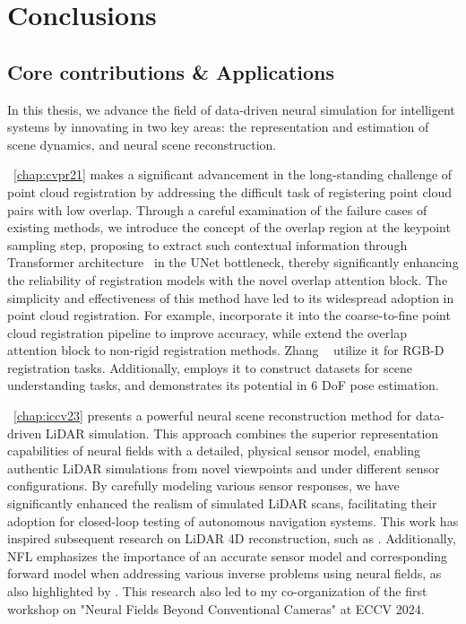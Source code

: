 \chapter{Conclusions}
\label{chap:conclusion}

\section{Core contributions \& Applications}
In this thesis, we advance the field of data-driven neural simulation for intelligent systems by innovating in two key areas: the representation and estimation of scene dynamics, and neural scene reconstruction.

~\cref{chap:cvpr21} makes a significant advancement in the long-standing challenge of point cloud registration by addressing the difficult task of registering point cloud pairs with low overlap. Through a careful examination of the failure cases of existing methods, we introduce the concept of the overlap region at the keypoint sampling step, proposing to extract such contextual information through Transformer architecture~\cite{vaswani2017attention} in the UNet bottleneck, thereby significantly enhancing the reliability of registration models with the novel overlap attention block. The simplicity and effectiveness of this method have led to its widespread adoption in point cloud registration. For example, \cite{qin2023geotransformer,yu2021cofinet} incorporate it into the coarse-to-fine point cloud registration pipeline to improve accuracy, while \cite{attaiki2021dpfm,li2022lepard} extend the overlap attention block to non-rigid registration methods. Zhang \etal~\cite{zhang2022pcr} utilize it for RGB-D registration tasks. Additionally, \cite{delitzas2024scenefun3d} employs it to construct datasets for scene understanding tasks, and \cite{wen2024foundationpose} demonstrates its potential in 6 DoF pose estimation.

~\cref{chap:iccv23} presents a powerful neural scene reconstruction method for data-driven LiDAR simulation. This approach combines the superior representation capabilities of neural fields with a detailed, physical sensor model, enabling authentic LiDAR simulations from novel viewpoints and under different sensor configurations. By carefully modeling various sensor responses, we have significantly enhanced the realism of simulated LiDAR scans, facilitating their adoption for closed-loop testing of autonomous navigation systems. This work has inspired subsequent research on LiDAR 4D reconstruction, such as \cite{zheng2024lidar4d,zhong20243d}. Additionally, NFL emphasizes the importance of an accurate sensor model and corresponding forward model when addressing various inverse problems using neural fields, as also highlighted by \cite{ehret2024radar,klinghoffer2024platonerf}. This research also led to my co-organization of the first workshop on "Neural Fields Beyond Conventional Cameras" at ECCV 2024.

